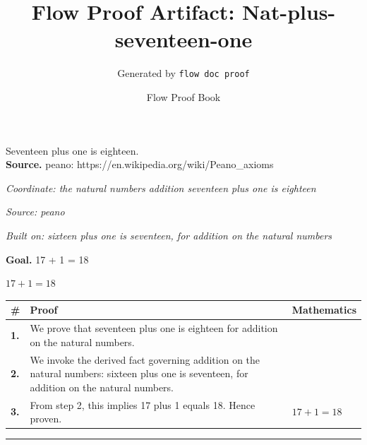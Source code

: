 \documentclass[11pt]{article}
\title{Flow Proof Artifact: Nat-plus-seventeen-one}
\author{Generated by \texttt{flow doc proof}}
\date{Flow Proof Book}
\theoremstyle{definition}
\begin{document}
\maketitle
Seventeen plus one is eighteen.\\[0.5em]
\textbf{Source.} peano: https://en.wikipedia.org/wiki/Peano\_axioms\\[0.5em]
\bigskip
{}\par
\smallskip\noindent\textit{Coordinate: the natural numbers \cdot addition \cdot seventeen plus one is eighteen}\par
\smallskip\noindent\textit{Source: peano}\par
\smallskip\noindent\textit{Built on: sixteen plus one is seventeen, for addition on the natural numbers}\par
\medskip
\noindent\textbf{Goal.} 17 + 1 = 18\par
\noindent$\displaystyle 17 + 1 = 18$\par
\medskip
\noindent
\begin{tabular}{@{} >{\raggedright\arraybackslash}p{} >{\raggedright\arraybackslash}p{} >{\raggedleft\arraybackslash}p{} @{}}
\textbf{\#} & \textbf{Proof} & \textbf{Mathematics} \\
\midrule
\textbf{1.} & We prove that seventeen plus one is eighteen for addition on the natural numbers. & \\[0.45em]
\textbf{2.} & We invoke the derived fact governing addition on the natural numbers: sixteen plus one is seventeen, for addition on the natural numbers. & \\[0.45em]
\textbf{3.} & From step 2, this implies 17 plus 1 equals 18. Hence proven. & $\displaystyle 17 + 1 = 18$ \\[0.45em]
\bottomrule
\end{tabular}
\label{thm:Nat-addition-seventeen_plus_one_is_eighteen}
\par\medskip\hrule
\end{document}
